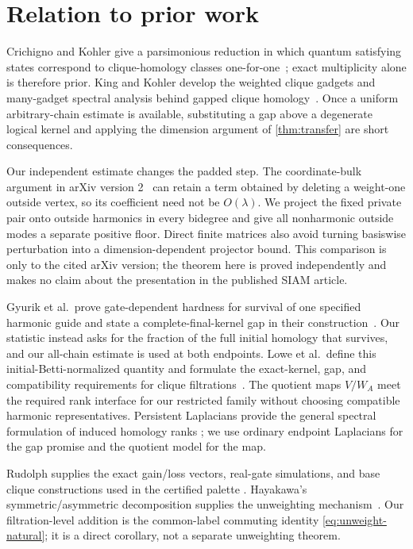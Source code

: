 \section{Relation to prior work}
\label{sec:related}

Crichigno and Kohler give a parsimonious reduction in which quantum
satisfying states correspond to clique-homology classes
one-for-one~\cite{crichigno2024clique}; exact multiplicity alone is therefore
prior.  King and Kohler develop the weighted clique gadgets and many-gadget
spectral analysis behind gapped clique homology~\cite{king2026gapped}.  Once a
uniform arbitrary-chain estimate is available, substituting a gap above a
degenerate logical kernel and applying the dimension argument of
\cref{thm:transfer} are short consequences.

Our independent estimate changes the padded step.  The coordinate-bulk
argument in arXiv version 2~\cite{king2023gappedv2} can retain a term obtained
by deleting a weight-one outside vertex, so its coefficient need not be
\(O(\lambda)\).  We project the fixed private pair onto outside harmonics in
every bidegree and give all nonharmonic outside modes a separate positive
floor.  Direct finite matrices also avoid turning basiswise perturbation into
a dimension-dependent projector bound.  This comparison is only to the
cited arXiv version; the theorem here is proved independently and makes no
claim about the presentation in the published SIAM article.

Gyurik et al.\ prove gate-dependent hardness for survival of one specified
harmonic guide and state a complete-final-kernel gap in their
construction~\cite{gyurik2026provable}.  Our statistic instead asks for the
fraction of the full initial homology that survives, and our all-chain estimate
is used at both endpoints.  Lowe et al.\ define this initial-Betti-normalized
quantity and formulate the exact-kernel, gap, and compatibility requirements
for clique filtrations~\cite{lowe2026normalized}.  The quotient maps
\(V/W_A\) meet the required rank interface for our restricted family without
choosing compatible harmonic representatives.  Persistent Laplacians provide
the general spectral formulation of induced homology ranks
\cite{memoli2022persistent}; we use ordinary endpoint Laplacians for the gap
promise and the quotient model for the map.

Rudolph supplies the exact gain/loss vectors, real-gate simulations, and base
clique constructions used in the certified palette
\cite{rudolph2026universal}.  Hayakawa's symmetric/asymmetric decomposition
supplies the unweighting mechanism~\cite{hayakawa2026unweighted}.  Our
filtration-level addition is the common-label commuting identity
\cref{eq:unweight-natural}; it is a direct corollary, not a separate
unweighting theorem.
